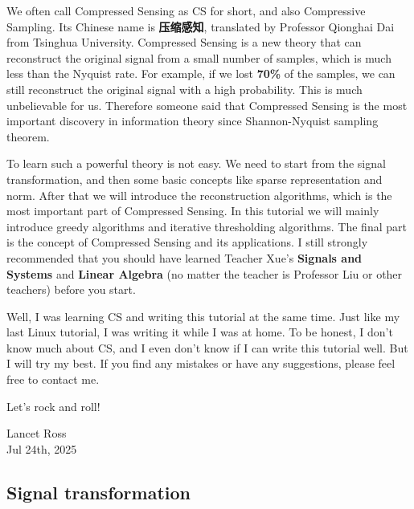\documentclass[12pt]{ctexart}
\begin{document}
We often call Compressed Sensing as CS for short, and also Compressive Sampling. Its
Chinese name is \textbf{压缩感知}, translated by Professor Qionghai Dai from Tsinghua
University. Compressed Sensing is a new theory that can reconstruct the original signal
from a small number of samples, which is much less than the Nyquist rate. For example, if
we lost \textbf{70\%} of the samples, we can still reconstruct the original signal with a
high probability. This is much unbelievable for us. Therefore someone said that Compressed
Sensing is the most important discovery in information theory since Shannon-Nyquist
sampling theorem.

To learn such a powerful theory is not easy. We need to start from the signal
transformation, and then some basic concepts like sparse representation and norm. After
that we will introduce the reconstruction algorithms, which is the most important part
of Compressed Sensing. In this tutorial we will mainly introduce greedy algorithms and
iterative thresholding algorithms. The final part is the concept of Compressed Sensing
and its applications. I still strongly recommended that you should have learned Teacher
Xue's \textbf{Signals and Systems} and \textbf{Linear Algebra} (no matter the teacher is 
Professor Liu or other teachers) before you start. 

Well, I was learning CS and writing this tutorial at the same time. Just like my last Linux
tutorial, I was writing it while I was at home. To be honest, I don't know much about CS,
and I even don't know if I can write this tutorial well. But I will try my best. If you find
any mistakes or have any suggestions, please feel free to contact me.

Let's rock and roll!

\begin{flushright}
  Lancet Ross\\
  Jul 24th, 2025
\end{flushright}

\newpage
\thispagestyle{empty}
\begin{center}
    \vspace*{96pt}
    \fontsize{60}{60}\par
    \fontsize{26}{31.2}\section{\textbf{Signal transformation}}\par %
    \vspace{25pt}
    \fontsize{18}{21.6}\par %
    \vfill
\end{center}
\end{document}
